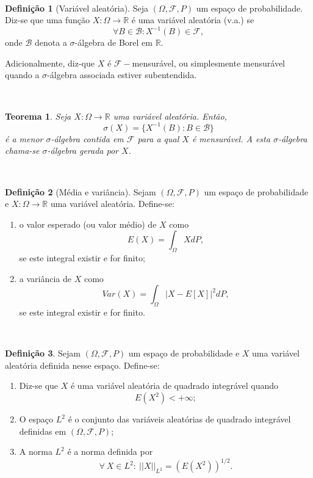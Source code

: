 \documentclass[
  11pt,
  a4paper,
]{book}
\newtheorem{theorem}{Teorema}[chapter]
\theoremstyle{definition}
\newtheorem{definition}{Definição}[chapter]
\theoremstyle{definition}
\theoremstyle{definition}
\theoremstyle{definition}
\theoremstyle{remark}
\begin{document}
\(\,\)

\begin{definition}[Variável aleatória]
Seja \((\Omega,\mathcal{F},P)\) um espaço de probabilidade. Diz-se que uma função \(X:\Omega \rightarrow \mathbb{R}\) é uma variável aleatória (v.a.) se
\[
\forall B \in \mathcal{B}: X^{-1}(B) \in \mathcal{F},
\]
onde \(\mathcal{B}\) denota a \(\sigma\)-álgebra de Borel em \(\mathbb{R}\).

Adicionalmente, diz-que \(X\) é \(\mathcal{F}-\)mensurável, ou simplesmente mensurável quando a \(\sigma\)-álgebra associada estiver subentendida.
\end{definition}

\(\,\)

\begin{theorem}
Seja \(X:\Omega \rightarrow \mathbb{R}\) uma variável aleatória. Então,
\[\sigma(X)=\{X^{-1}(B): B \in \mathcal{B}\}\]
é a menor \(\sigma\)-álgebra contida em \(\mathcal{F}\) para a qual \(X\) é mensurável. A esta \(\sigma\)-álgebra chama-se \(\sigma\)-álgebra gerada por \(X\).
\end{theorem}

\(\,\)

\begin{definition}[Média e variância]

Sejam \((\Omega,\mathcal{F},P)\) um espaço de probabilidade e \(X:\Omega \rightarrow \mathbb{R}\) uma variável aleatória. Define-se:

\begin{enumerate}
\def\labelenumi{\roman{enumi})}
\item
  o valor esperado (ou valor médio) de \(X\) como
  \[
  E(X)=\int_{\Omega}{X}dP,
  \]
  se este integral existir e for finito;
\item
  a variância de \(X\) como
  \[
  Var(X)=\int_{\Omega}{|X-E[X]|^2}dP,
  \]
  se este integral existir e for finito.
\end{enumerate}

\end{definition}

\(\,\)

\begin{definition}

Sejam \((\Omega,\mathcal{F},P)\) um espaço de probabilidade e \(X\) uma variável aleatória definida nesse espaço. Define-se:

\begin{enumerate}
\def\labelenumi{\roman{enumi})}
\item
  Diz-se que \(X\) é uma variável aleatória de quadrado integrável quando
  \[E(X^2)<+\infty;\]
\item
  O espaço \(L^2\) é o conjunto das variáveis aleatórias de quadrado integrável definidas em \((\Omega,\mathcal{F},P)\);
\item
  A norma \(L^2\) é a norma definida por
  \[\forall ~ X \in L^2:~ ||X||_{L^2} = \left(E(X^2)\right)^{1/2}.\]
\end{enumerate}

\end{definition}
\end{document}
